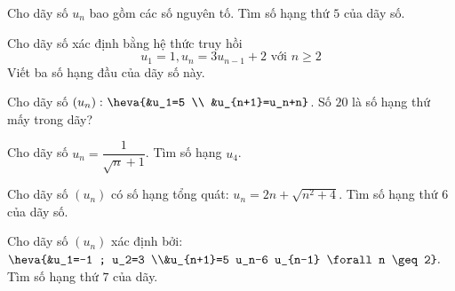 \begin{vd}[NB]%
	Cho dãy số $u_n$ bao gồm các số nguyên tố. Tìm số hạng thứ $5$ của dãy số.
\end{vd}

\begin{vd}[TH]%
	Cho dãy số xác định bằng hệ thức truy hồi
	$$
	u_1=1, u_n=3 u_{n-1}+2 \text { với } n \geq 2
	$$
	Viết ba số hạng đầu của dãy số này.
\end{vd}

\begin{vd}[VD]%
	Cho dãy số $\left(u_n\right)\colon\heva{&u_1=5 \\ &u_{n+1}=u_n+n}$. Số $20$ là số hạng thứ mấy trong dãy?
\end{vd}

\begin{bt}[NB]%
	Cho dãy số $u_n=\dfrac{1}{\sqrt{n}+1}$. Tìm số hạng $u_4$.	
\end{bt}

\begin{bt}[NB]%
	Cho dãy số $(u_n)$ có số hạng tổng quát: $u_n=2 n+\sqrt{n^2+4}$. Tìm số hạng thứ $6$ của dãy số.
\end{bt}

\begin{bt}[NB]%
	Cho dãy số $(u_n)$ xác định bởi: $\heva{&u_1=-1 ; u_2=3 \\&u_{n+1}=5 u_n-6 u_{n-1} \forall n \geq 2}.$ Tìm số hạng thứ $7$ của dãy.
\end{bt}

